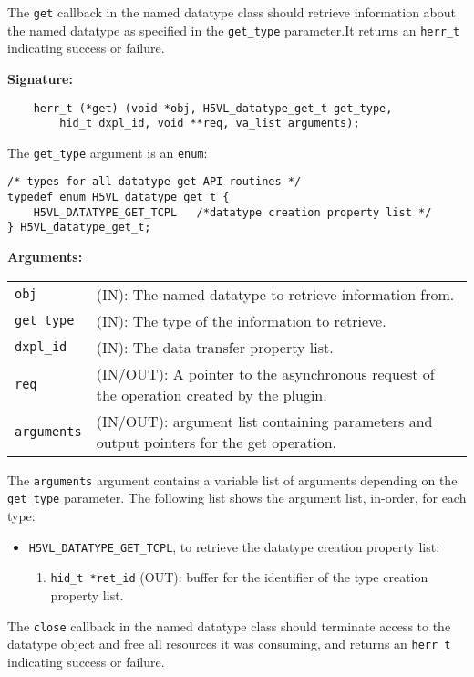 The {\tt get} callback in the named datatype class should retrieve
information about the named datatype as specified in the {\tt get\_type}
parameter.It returns an {\tt herr\_t} indicating success or failure.

\textbf{Signature:}
\begin{lstlisting}
    herr_t (*get) (void *obj, H5VL_datatype_get_t get_type, 
        hid_t dxpl_id, void **req, va_list arguments);
\end{lstlisting}

The {\tt get\_type} argument is an {\tt enum}:
\begin{lstlisting}
/* types for all datatype get API routines */
typedef enum H5VL_datatype_get_t {
    H5VL_DATATYPE_GET_TCPL   /*datatype creation property list */
} H5VL_datatype_get_t;
\end{lstlisting}

\textbf{Arguments:}\\
\begin{tabular}{l p{10cm}}
  {\tt obj} & (IN): The named datatype to retrieve information from.\\
  {\tt get\_type} & (IN): The type of the information to retrieve.\\
  {\tt dxpl\_id} & (IN): The data transfer property list.\\
  {\tt req} & (IN/OUT): A pointer to the asynchronous request of the
  operation created by the plugin.\\
  {\tt arguments} & (IN/OUT): argument list containing parameters and
  output pointers for the get operation. \\
\end{tabular}

The {\tt arguments} argument contains a variable list of arguments
depending on the {\tt get\_type} parameter. The following list shows
the argument list, in-order, for each type:

\begin{itemize}
\item {\tt H5VL\_DATATYPE\_GET\_TCPL}, to retrieve the datatype
  creation property list:
  \begin{enumerate}
  \item {\tt hid\_t *ret\_id} (OUT): buffer for the identifier of the
    type creation property list.
  \end{enumerate}
\end{itemize}

The {\tt close} callback in the named datatype class should terminate
access to the datatype object and free all resources it was
consuming, and returns an {\tt herr\_t} indicating success or failure.

